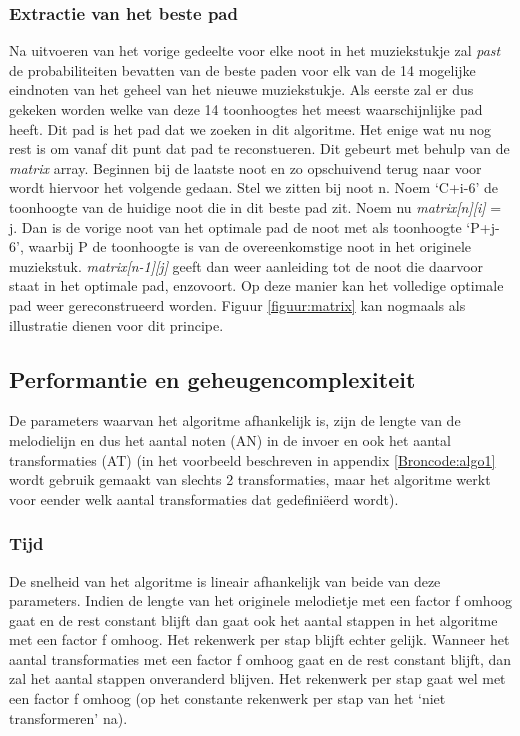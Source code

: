 \subsubsection{Extractie van het beste pad}
Na uitvoeren van het vorige gedeelte voor elke noot in het muziekstukje zal \textit{past} de probabiliteiten bevatten van de beste paden voor elk van de 14 mogelijke eindnoten van het geheel van het nieuwe muziekstukje. Als eerste zal er dus gekeken worden welke van deze 14 toonhoogtes het meest waarschijnlijke pad heeft. Dit pad is het pad dat we zoeken in dit algoritme. Het enige wat nu nog rest is om vanaf dit punt dat pad te reconstueren. Dit gebeurt met behulp van de \textit{matrix} array. Beginnen bij de laatste noot en zo opschuivend terug naar voor wordt hiervoor het volgende gedaan. Stel we zitten bij noot n. Noem `C+i-6' de toonhoogte van de huidige noot die in dit beste pad zit. Noem nu \textit{matrix[n][i]} = j. Dan is de vorige noot van het optimale pad de noot met als toonhoogte `P+j-6', waarbij P de toonhoogte is van de overeenkomstige noot in het originele muziekstuk. \textit{matrix[n-1][j]} geeft dan weer aanleiding tot de noot die daarvoor staat in het optimale pad, enzovoort. Op deze manier kan het volledige optimale pad weer gereconstrueerd worden. Figuur \ref{figuur:matrix} kan nogmaals als illustratie dienen voor dit principe.

\subsection{Performantie en geheugencomplexiteit}
De parameters waarvan het algoritme afhankelijk is, zijn de lengte van de melodielijn en dus het aantal noten (AN) in de invoer en ook het aantal transformaties (AT) (in het voorbeeld beschreven in appendix \ref{Broncode:algo1} wordt gebruik gemaakt van slechts 2 transformaties, maar het algoritme werkt voor eender welk aantal transformaties dat gedefini\"eerd wordt).

\subsubsection{Tijd} 
De snelheid van het algoritme is lineair afhankelijk van beide van deze parameters. Indien de lengte van het originele melodietje met een factor f omhoog gaat en de rest constant blijft dan gaat ook het aantal stappen in het algoritme met een factor f omhoog. Het rekenwerk per stap blijft echter gelijk. Wanneer het aantal transformaties met een factor f omhoog gaat en de rest constant blijft, dan zal het aantal stappen onveranderd blijven. Het rekenwerk per stap gaat wel met een factor f omhoog (op het constante rekenwerk per stap van het `niet transformeren' na).

